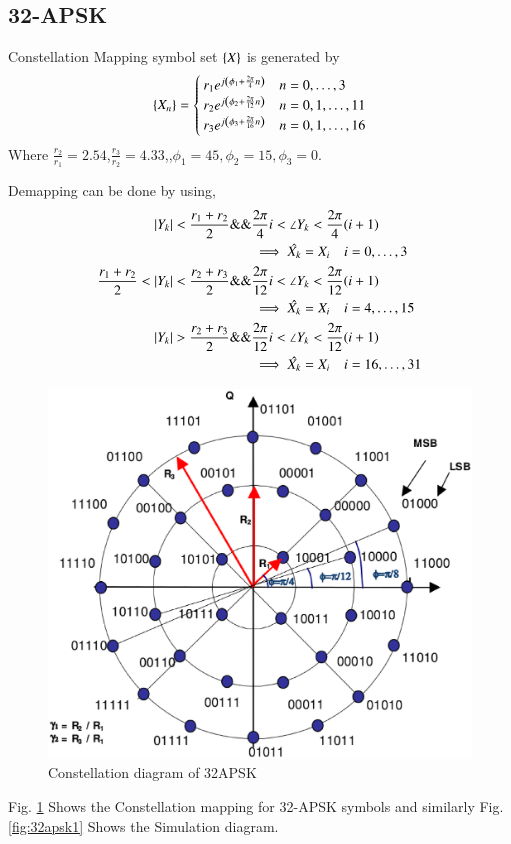 \documentclass[journal,12pt,twocolumn]{IEEEtran}
\begin{document}
\subsection{32-APSK}
Constellation Mapping symbol set $\left\{X\right\}$ is generated by
\begin{equation}
\left\{X_n\right\}=
\begin{cases}
r_1 e^{j\left(\phi_1+\frac{2\pi}{4}n\right)}& n=0,\dots,3\\
r_2 e^{j\left(\phi_2+\frac{2\pi}{12}n\right)}& n=0,1,\dots,11\\
r_3 e^{j\left(\phi_3+\frac{2\pi}{16}n\right)}& n=0,1,\dots,16
\end{cases}
\end{equation}
Where $\frac{r_2}{r_1}=2.54$,$\frac{r_3}{r_2}=4.33$,,$\phi_1=45,\phi_2=15,\phi_3=0$.

Demapping can be done by using,
\begin{align}
\left\vert Y_k\right\vert<\frac{r_1+r_2}{2} \&\& & \frac{2\pi }{4}i < \angle{Y_k} < \frac{2\pi }{4}(i+1)\\
& \implies \hat{X_k}=X_i \quad i=0,\dots,3\\
\frac{r_1+r_2}{2}<\left\vert Y_k\right\vert<\frac{r_2+r_3}{2} \&\& & \frac{2\pi }{12}i < \angle{Y_k} < \frac{2\pi }{12}(i+1)\\
& \implies \hat{X_k}=X_i \quad i=4,\dots,15 \\ 
\left\vert Y_k\right\vert>\frac{r_2+r_3}{2} \&\& & \frac{2\pi }{12}i < \angle{Y_k} < \frac{2\pi }{12}(i+1)\\
& \implies \hat{X_k}=X_i \quad i=16,\dots,31
\end{align}

\begin{figure}[!ht]
\begin{center}
\includegraphics[width=\columnwidth]{./figs/32APSK}
\end{center}
\caption{Constellation diagram of 32APSK}
\label{fig:32apsk}
\end{figure}
Fig. \ref{fig:32apsk} Shows the Constellation mapping for 32-APSK symbols and similarly Fig. \ref{fig:32apsk1} Shows the Simulation diagram.
\end{document}
